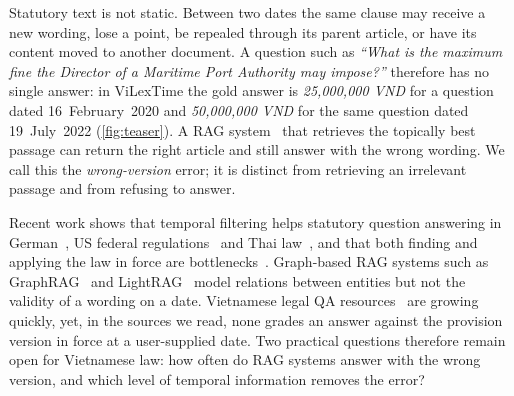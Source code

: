 \documentclass[sigconf,anonymous,review]{acmart}
\newcommand{\vi}[1]{\textit{#1}}
\begin{document}
Statutory text is not static. Between two dates the same clause may receive a new wording, lose a point, be repealed through its parent article, or have its content moved to another document. A question such as \vi{``What is the maximum fine the Director of a Maritime Port Authority may impose?''} therefore has no single answer: in ViLexTime the gold answer is \vi{25{,}000{,}000 VND} for a question dated 16~February~2020 and \vi{50{,}000{,}000 VND} for the same question dated 19~July~2022 (\cref{fig:teaser}). A RAG system~\cite{lewis2020rag} that retrieves the topically best passage can return the right article and still answer with the wrong wording. We call this the \emph{wrong-version} error; it is distinct from retrieving an irrelevant passage and from refusing to answer.

Recent work shows that temporal filtering helps statutory question answering in German~\cite{prior2026oldfriend}, US federal regulations~\cite{yao2026lawinforce} and Thai law~\cite{akarajaradwong2026nitibenchplus}, and that both finding and applying the law in force are bottlenecks~\cite{yao2026lawinforce}. Graph-based RAG systems such as GraphRAG~\cite{edge2024graphrag} and LightRAG~\cite{guo2025lightrag} model relations between entities but not the validity of a wording on a date. Vietnamese legal QA resources~\cite{thanh2021alqac,nguyen2025vlqa,nguyen2026vihermes,dong2026vietlegal,nguyen2026vilegalexpert} are growing quickly, yet, in the sources we read, none grades an answer against the provision version in force at a user-supplied date. Two practical questions therefore remain open for Vietnamese law: how often do RAG systems answer with the wrong version, and which level of temporal information removes the error?
\end{document}
